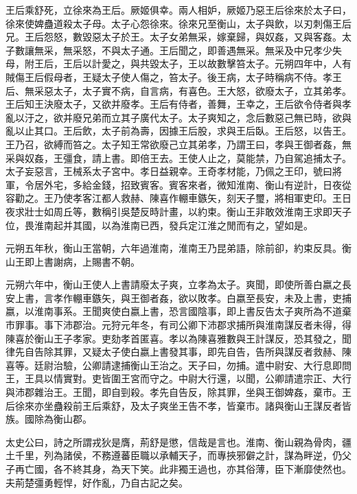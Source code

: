 王后乘舒死，立徐來為王后。厥姬俱幸。兩人相妒，厥姬乃惡王后徐來於太子曰，徐來使婢蠱道殺太子母。太子心怨徐來。徐來兄至衡山，太子與飲，以刃刺傷王后兄。王后怨怒，數毀惡太子於王。太子女弟無采，嫁棄歸，與奴姦，又與客姦。太子數讓無采，無采怒，不與太子通。王后聞之，即善遇無采。無采及中兄孝少失母，附王后，王后以計愛之，與共毀太子，王以故數擊笞太子。元朔四年中，人有賊傷王后假母者，王疑太子使人傷之，笞太子。後王病，太子時稱病不侍。孝王后、無采惡太子，太子實不病，自言病，有喜色。王大怒，欲廢太子，立其弟孝。王后知王決廢太子，又欲并廢孝。王后有侍者，善舞，王幸之，王后欲令侍者與孝亂以汙之，欲并廢兄弟而立其子廣代太子。太子爽知之，念后數惡己無已時，欲與亂以止其口。王后飲，太子前為壽，因據王后股，求與王后臥。王后怒，以告王。王乃召，欲縛而笞之。太子知王常欲廢己立其弟孝，乃謂王曰，孝與王御者姦，無采與奴姦，王彊食，請上書。即倍王去。王使人止之，莫能禁，乃自駕追捕太子。太子妄惡言，王械系太子宮中。孝日益親幸。王奇孝材能，乃佩之王印，號曰將軍，令居外宅，多給金錢，招致賓客。賓客來者，微知淮南、衡山有逆計，日夜從容勸之。王乃使孝客江都人救赫、陳喜作輣車鏃矢，刻天子璽，將相軍吏印。王日夜求壯士如周丘等，數稱引吳楚反時計畫，以約束。衡山王非敢效淮南王求即天子位，畏淮南起并其國，以為淮南已西，發兵定江淮之閒而有之，望如是。

元朔五年秋，衡山王當朝，六年過淮南，淮南王乃昆弟語，除前卻，約束反具。衡山王即上書謝病，上賜書不朝。

元朔六年中，衡山王使人上書請廢太子爽，立孝為太子。爽聞，即使所善白嬴之長安上書，言孝作輣車鏃矢，與王御者姦，欲以敗孝。白嬴至長安，未及上書，吏捕嬴，以淮南事系。王聞爽使白嬴上書，恐言國陰事，即上書反告太子爽所為不道棄市罪事。事下沛郡治。元狩元年冬，有司公卿下沛郡求捕所與淮南謀反者未得，得陳喜於衡山王子孝家。吏劾孝首匿喜。孝以為陳喜雅數與王計謀反，恐其發之，聞律先自告除其罪，又疑太子使白嬴上書發其事，即先自告，告所與謀反者救赫、陳喜等。廷尉治驗，公卿請逮捕衡山王治之。天子曰，勿捕。遣中尉安、大行息即問王，王具以情實對。吏皆圍王宮而守之。中尉大行還，以聞，公卿請遣宗正、大行與沛郡雜治王。王聞，即自剄殺。孝先自告反，除其罪，坐與王御婢姦，棄市。王后徐來亦坐蠱殺前王后乘舒，及太子爽坐王告不孝，皆棄市。諸與衡山王謀反者皆族。國除為衡山郡。

太史公曰，詩之所謂戎狄是膺，荊舒是懲，信哉是言也。淮南、衡山親為骨肉，疆土千里，列為諸侯，不務遵蕃臣職以承輔天子，而專挾邪僻之計，謀為畔逆，仍父子再亡國，各不終其身，為天下笑。此非獨王過也，亦其俗薄，臣下漸靡使然也。夫荊楚彊勇輕悍，好作亂，乃自古記之矣。